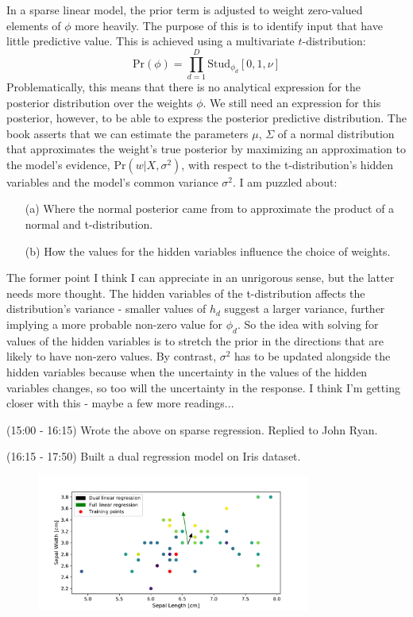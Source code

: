 \documentclass[idxtotoc,hyperref,openany]{labbook} %
\begin{document}
In a sparse linear model, the prior term is adjusted to weight zero-valued elements of $\phi$ more heavily. The purpose of this is to identify input that have little predictive value. This is achieved using a multivariate $t$-distribution:
\[
	\text{Pr}(\phi) = \prod_{d = 1}^{D} \text{Stud}_{\phi_d}[0, 1, \nu]
\]
Problematically, this means that there is no analytical expression for the posterior distribution over the weights $\phi$. We still need an expression for this posterior, however, to be able to express the posterior predictive distribution. The book asserts that we can estimate the parameters $\mu$, $\Sigma$ of a normal distribution that approximates the weight's true posterior by maximizing an approximation to the model's evidence, $\text{Pr}(w|X, \sigma^2)$, with respect to the t-distribution's hidden variables and the model's common variance $\sigma^2$. I am puzzled about:
\begin{itemize}
	\item[(a)] Where the normal posterior came from to approximate the product of a normal and t-distribution.
	\item[(b)] How the values for the hidden variables influence the choice of weights.
\end{itemize}
The former point I think I can appreciate in an unrigorous sense, but the latter needs more thought. The hidden variables of the t-distribution affects the distribution's variance - smaller values of $h_d$ suggest a larger variance, further implying a more probable non-zero value for $\phi_d$. So the idea with solving for values of the hidden variables is to stretch the prior in the directions that are likely to have non-zero values. By contrast, $\sigma^2$ has to be updated alongside the hidden variables because when the uncertainty in the values of the hidden variables changes, so too will the uncertainty in the response. I think I'm getting closer with this - maybe a few more readings...

(15:00 - 16:15) Wrote the above on sparse regression. Replied to John Ryan.

(16:15 - 17:50) Built a dual regression model on Iris dataset.
\begin{figure}[h!]
\centering
\includegraphics[width=0.8\textwidth]{dual_linear_regression.pdf}
\end{figure}
\end{document}
